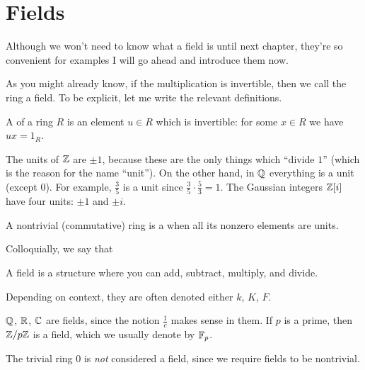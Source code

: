 \section{Fields}

Although we won't need to know what a field is until next chapter,
they're so convenient for examples I will go ahead and introduce them now.

As you might already know, if the multiplication is invertible,
then we call the ring a field.
To be explicit, let me write the relevant definitions.

\begin{definition}
	\label{def:unit}
	A  of a ring $R$
	is an element $u \in R$ which is invertible:
	for some $x \in R$ we have $ux = 1_R$.
\end{definition}

\begin{example}
	\listhack
	\begin{enumerate}[(a)]
	\ii The units of $\mathbb Z$ are $\pm 1$,
	because these are the only things which ``divide $1$''
	(which is the reason for the name ``unit'').
	\ii On the other hand, in $\mathbb Q$ everything is a unit (except $0$).
	For example, $\frac 35$ is a unit since
	$\frac 35 \cdot \frac 53 = 1$.
	\ii The Gaussian integers $\mathbb Z[i]$ have four units:
	$\pm 1$ and $\pm i$.
	\end{enumerate}
\end{example}

\begin{definition}
	A nontrivial (commutative) ring is a 
	when all its nonzero elements are units.
\end{definition}

Colloquially, we say that
\begin{moral}
	A field is a structure where you can add, subtract, multiply, and divide.
\end{moral}
Depending on context, they are often denoted
either $k$, $K$, $F$.

\begin{example}
	\listhack
	\begin{enumerate}[(a)]
		\ii $\mathbb Q$, $\mathbb R$, $\mathbb C$ are fields,
		since the notion $\frac 1c$ makes sense in them.
		\ii If $p$ is a prime, then $\mathbb Z/p\mathbb Z$ is a field,
		which we usually denote by $\mathbb F_p$.
	\end{enumerate}
	The trivial ring $0$ is \emph{not} considered a field,
	since we require fields to be nontrivial.
\end{example}

